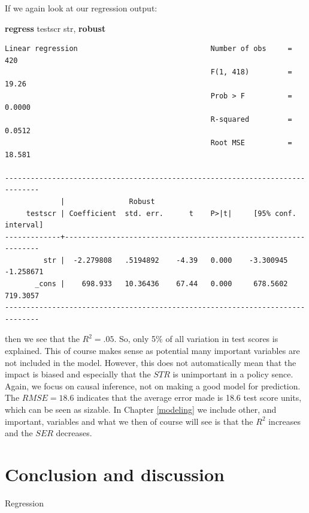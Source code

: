 \documentclass[
]{book}
\newenvironment{Shaded}{\begin{snugshade}}{\end{snugshade}}
\newcommand{\KeywordTok}[1]{\textcolor[rgb]{0.13,0.29,0.53}{\textbf{#1}}}
\newcommand{\NormalTok}[1]{#1}
\begin{document}
If we again look at our regression output:

\begin{Shaded}
\begin{Highlighting}[]
\KeywordTok{regress}\NormalTok{ testscr str, }\KeywordTok{robust}
\end{Highlighting}
\end{Shaded}

\begin{verbatim}
Linear regression                               Number of obs     =        420
                                                F(1, 418)         =      19.26
                                                Prob > F          =     0.0000
                                                R-squared         =     0.0512
                                                Root MSE          =     18.581

------------------------------------------------------------------------------
             |               Robust
     testscr | Coefficient  std. err.      t    P>|t|     [95% conf. interval]
-------------+----------------------------------------------------------------
         str |  -2.279808   .5194892    -4.39   0.000    -3.300945   -1.258671
       _cons |    698.933   10.36436    67.44   0.000     678.5602    719.3057
------------------------------------------------------------------------------
\end{verbatim}

then we see that the \(R^2 = .05\). So, only 5\% of all variation in test scores is explained. This of course makes sense as potential many important variables are not included in the model. However, this does not automatically mean that the impact is biased and especially that the \(STR\) is unimportant in a policy sence. Again, we focus on causal inference, not on making a good model for prediction. The \(RMSE= 18.6\) indicates that the average error made is 18.6 test score units, which can be seen as sizable. In Chapter \ref{modeling} we include other, and important, variables and what we then of course will see is that the \(R^2\) increases and the \(SER\) decreases.

\hypertarget{conclusion-and-discussion-1}{%
\section{Conclusion and discussion}\label{conclusion-and-discussion-1}}

Regression
\end{document}
